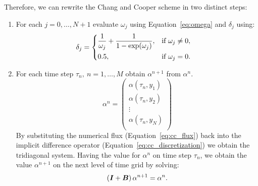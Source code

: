 \documentclass{article}
\def\B{\mbox{\boldmath $B$}}
\def\I{\mbox{\boldmath $I$}}
\begin{document}
Therefore, we can rewrite the Chang and Cooper scheme in two distinct steps:
\begin{enumerate}
    \item For each $j=0,\ldots, N+1$ evaluate $\omega_j$ using Equation~\ref{eq:omega} and $\delta_j$ using:
    $$
    \begin{aligned}
        \delta_j &=
        \begin{dcases}
            \frac{1}{\omega_j} + \frac{1}{1 - \exp(\omega_j)}, & \text{if } \omega_j \neq 0, \\
            0.5, & \text{if } \omega_j = 0.
        \end{dcases}
    \end{aligned}
    $$
    
    \item For each time step $\tau_n,\ n=1,\ldots,M$ obtain $\alpha^{n+1}$ from $\alpha^{n}$.
    \begin{equation*} 
        \alpha^n = \begin{pmatrix}
        \alpha(\tau_n, y_1)\\
        \alpha(\tau_n, y_2)\\
        \vdots \\
        \alpha(\tau_n, y_N)\\
    \end{pmatrix}	
    \end{equation*}
    By substituting the numerical flux (Equation~\ref{eq:cc_flux}) back into the implicit difference operator (Equation~\ref{eq:cc_discretization}) we obtain the tridiagonal system.
    Having the value for $\alpha^n$ on time step $\tau_n$, we obtain the value $\alpha^{n+1}$ on the next level of time grid by solving:
    $$
    \left(\I + \B \right) \alpha^{n+1} = \alpha^n.
    $$
    

\end{enumerate}
\end{document}
